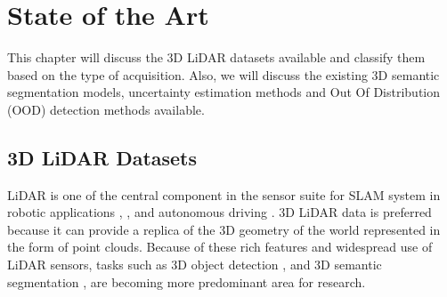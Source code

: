 

    \chapter{State of the Art}
    This chapter will discuss the 3D LiDAR datasets available and classify them based on the type of acquisition.
    Also, we will discuss the existing 3D semantic segmentation models, uncertainty estimation methods and Out Of Distribution (OOD) detection methods available.
    \section{3D LiDAR Datasets}
    LiDAR is one of the central component in the sensor suite for SLAM system in robotic applications \cite{thrun2006stanley}, \cite{patz2008practical}, \cite{hess20162dSLAM} and autonomous driving \cite{li2016vehicle}.
    3D LiDAR data is preferred because it can provide a replica of the 3D geometry of the world represented in the form of point clouds.
    Because of these rich features and widespread use of LiDAR sensors, tasks such as 3D object detection \cite{zhou2018voxelnet}, \cite{PIXOR} and 3D semantic segmentation \cite{qi2017pointnet++}, \cite{3Dmininet} are becoming more predominant area for research.
    
